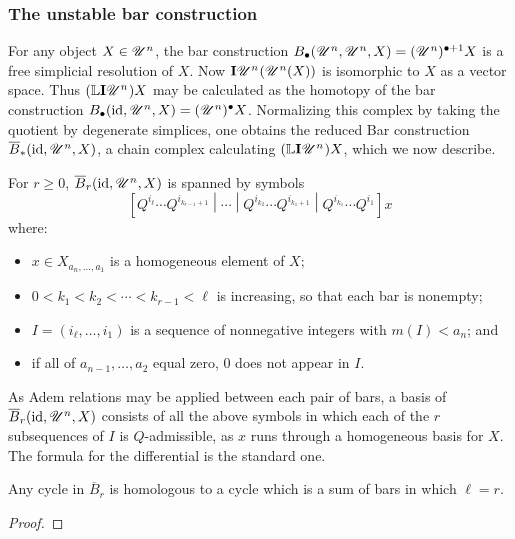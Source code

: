 \documentclass[11pt]{article}
\newcommand{\nontop}[1]{\scrU^{#1}}%
\newcommand{\Ind}[2][]{\mathbf{I}{#2}_{#1}}%
\newcommand{\Fr}[1]{#1}%
\newcommand{\derived}{\mathbb{L}}
\newcommand{\LambdaOp}{Q}
\begin{document}
\begin{KoszulComplexes}
\subsubsection*{The unstable bar construction}
For any object $X\in\nontop{n}$, the bar construction ${B}_\bullet(\Fr{\nontop{n}},\Fr{\nontop{n}},X)=(\Fr{\nontop{n}})^{\bullet+1}X$ is a free simplicial resolution of $X$. Now $\Ind{\nontop{n}}(\Fr{\nontop{n}}(X))$ is isomorphic to $X$ as a vector space. Thus $(\derived\Ind{\nontop{n}})X$ may be calculated as the homotopy of the bar construction $B_\bullet(\id,\Fr{\nontop{n}},X)=(\Fr{\nontop{n}})^\bullet X$. Normalizing this complex by taking the quotient by degenerate simplices, one obtains the reduced Bar construction $\overline{B}_*(\id,\Fr{\nontop{n}},X)$, a chain complex calculating $(\derived\Ind{\nontop{n}})X$, which we now describe.
\begin{prop*}
For $r\geq0$, $\overline{B}_r(\id,\Fr{\nontop{n}},X)$ is spanned by symbols
\[\left[\LambdaOp^{i_\ell}\cdots \LambdaOp^{i_{k_{r-1}+1}}
\middle|\cdots 
\middle|\LambdaOp^{i_{k_2}}\cdots \LambdaOp^{i_{k_1+1}}
\middle|\LambdaOp^{i_{k_1}}\cdots \LambdaOp^{i_1}\right]
x\]
where:
\begin{itemize}
\setlength{\parindent}{.25in}
\item $x\in X_{a_n,\ldots,a_1}$ is a homogeneous element of $X$;
\item $0<k_1<k_2<\cdots <k_{r-1}<\ell$ is increasing, so that each bar is nonempty;
\item $I=(i_\ell,\ldots,i_1)$ is a sequence of nonnegative integers with $m(I)<a_n$; and
\item if all of $a_{n-1},\ldots,a_2$ equal zero, $0$ does not appear in $I$.
\end{itemize}
As Adem relations may be applied between each pair of bars, a basis of $\overline{B}_r(\id,\Fr{\nontop{n}},X)$ consists of all the above symbols in which each of the $r$ subsequences of $I$ is $\LambdaOp$-admissible, as $x$ runs through a homogeneous basis for $X$. The formula for the differential is the standard one.
\end{prop*}
\begin{prop*}
Any cycle in $\overline{B}_r$ is homologous to a cycle which is a sum of bars in which  $\ell=r$.
\end{prop*}
\begin{proof}

\end{proof}
%

\end{KoszulComplexes}
\end{document}
